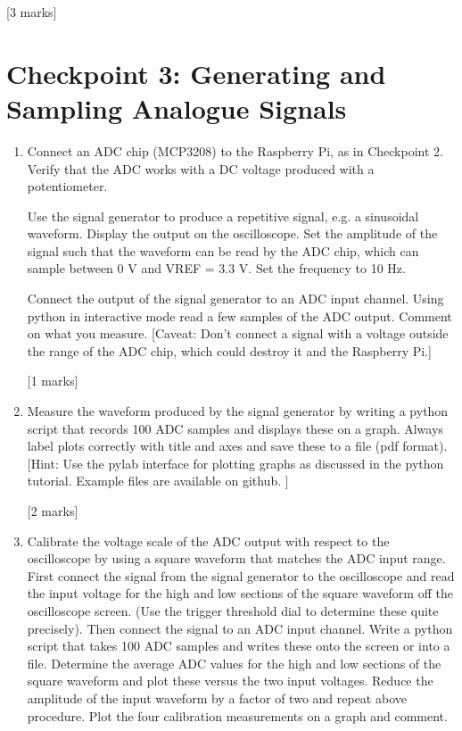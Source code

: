 \begin{enumerate}
\hfill [3 marks]\\

\end{enumerate}



\newpage
\section{Checkpoint 3:  Generating and Sampling Analogue Signals}

\begin{enumerate}

\item [3.1.] Connect an ADC chip (MCP3208) to the Raspberry Pi, as in Checkpoint 2. Verify that the ADC works with a DC voltage produced with a potentiometer.

Use the signal generator to produce a repetitive signal, e.g. a sinusoidal waveform. Display the output on the oscilloscope. Set the amplitude of the signal such that the waveform can be read by the ADC chip, which can sample between 0 V and VREF = 3.3 V. Set the frequency to 10 Hz.  

Connect the output of the signal generator to an ADC input channel. Using python in interactive mode read a few samples of the ADC output. Comment on what you measure. [Caveat: Don't connect a signal with a voltage outside the range of the ADC chip, which could destroy it and the Raspberry Pi.] 

\hfill [1 marks]\\

\item [3.2.] Measure the waveform produced by the signal generator by writing a python script that records 100 ADC samples and displays these on a graph. Always label plots correctly with title and axes and save these to a file (pdf format). 
[Hint: Use the pylab interface for plotting graphs as discussed in the python tutorial. Example files are available on github. ]

\hfill [2 marks] \\

\item [3.3.] Calibrate the voltage scale of the ADC output with respect to the oscilloscope by using a square waveform that matches the ADC input range.  First connect the signal from the signal generator to the oscilloscope and read the input voltage for the high and low sections of the square waveform off the oscilloscope screen. (Use the trigger threshold dial to determine these quite precisely). Then connect the signal to an ADC input channel. Write a python script that takes 100 ADC samples and writes these onto the screen or into a file. Determine the average ADC values for the high and low sections of the square waveform and plot these versus the two input voltages. Reduce the amplitude of the input waveform by a factor of two and repeat above procedure.  Plot the four calibration measurements on a graph and comment.


\end{enumerate}
